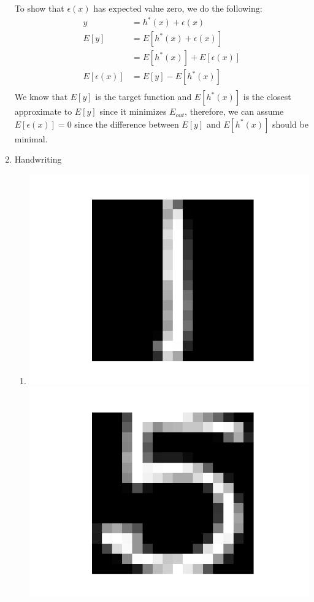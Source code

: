 \documentclass{article}
\begin{document}
\begin{enumerate}
        To show that $\epsilon (x)$ has expected value zero, we do the following:
        \begin{align*}
            y &= h^*(x) + \epsilon (x)\\
            E[y] &= E[h^*(x) + \epsilon (x)]\\
            &= E[h^*(x)] + E[\epsilon (x)]\\
            E[\epsilon(x)] &= E[y] - E[h^*(x)]\\
        \end{align*}
        We know that $E[y]$ is the target function and $E[h^*(x)]$ is the closest approximate to $E[y]$ since it minimizes $E_{out}$, therefore, we can assume $E[\epsilon (x)] = 0$ since the difference between $E[y]$ and $E[h^*(x)]$ should be minimal.

        \item Handwriting
        \begin{enumerate}[label=(\alph*)]
            \item \includegraphics[scale=0.5]{images/3_8_1.png}\\ \includegraphics[scale=0.5]{images/3_8_5.png}

\end{enumerate}
\end{enumerate}
\end{document}
